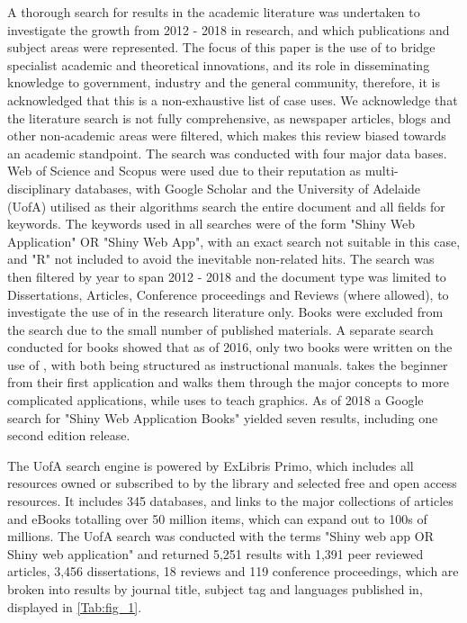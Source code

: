 A thorough search for  results in the academic literature was undertaken to investigate the growth from 2012 - 2018 in research, and which publications and subject areas were represented. The focus of this paper is the use of  to bridge specialist academic and theoretical innovations, and its role in disseminating knowledge to government, industry and the general community, therefore, it is acknowledged that this is a non-exhaustive list of  case uses. We acknowledge that the literature search is not fully comprehensive, as newspaper articles, blogs and other non-academic areas were filtered, which makes this review biased towards an academic standpoint. The search was conducted with four major data bases.  Web of Science and Scopus were used due to their reputation as multi-disciplinary databases, with Google Scholar and the University of Adelaide (UofA) utilised as their algorithms search the entire document and all fields for keywords.  The keywords used in all searches were of the form "Shiny Web Application" OR "Shiny Web App", with an exact search not suitable in this case, and "R" not included to avoid the inevitable non-related hits.  The search was then filtered by year to span 2012 - 2018 and the document type was limited to Dissertations, Articles, Conference proceedings and Reviews (where allowed), to investigate the use of  in the research literature only.  Books were excluded from the search due to the small number of published materials.  A separate search conducted for books showed that as of 2016, only two books were written on the use of , with both being structured as instructional manuals.  \citet{beeley_web_2013} takes the beginner from their first application and walks them through the major concepts to more complicated applications, while \citet{moon_learn_2016} uses  to teach  \citep{wickham_ggplot2_2018} graphics. As of 2018 a Google search for "Shiny Web Application Books" yielded seven results, including one second edition release.

The UofA search engine is powered by ExLibris Primo, which includes all resources owned or subscribed to by the library and selected free and open access resources.  It includes 345 databases, and links to the major collections of articles and eBooks totalling over 50 million items, which can expand out to 100s of millions.  The UofA search was conducted with the terms "Shiny web app OR Shiny web application" and returned 5,251 results with 1,391 peer reviewed articles, 3,456 dissertations, 18 reviews and 119 conference proceedings, which are broken into results by journal title, subject tag and languages published in, displayed in \autoref{Tab:fig_1}.

